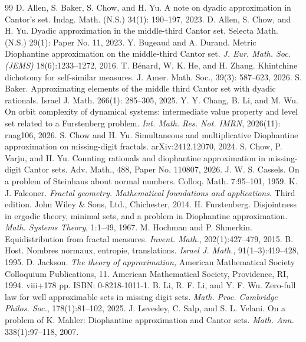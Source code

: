 \documentclass[10pt,a4paper]{amsart}
\numberwithin{equation}{section} %
\begin{document}
\begin{thebibliography}{99}
 D. Allen, S. Baker, S. Chow, and H. Yu. A note on dyadic approximation in Cantor's set. Indag. Math. (N.S.) 34(1): 190–197, 2023.
 D. Allen, S. Chow, and H. Yu. Dyadic approximation in the middle-third Cantor set. Selecta Math. (N.S.) 29(1): Paper No. 11, 2023.
 Y. Bugeaud and A. Durand. Metric Diophantine approximation on the middle-third Cantor set. {\em J. Eur. Math. Soc. (JEMS)} 18(6):1233--1272, 2016.
 T. Bénard, W. K. He, and H. Zhang. Khintchine dichotomy for self-similar measures. J. Amer. Math. Soc., 39(3): 587--623, 2026.
 S. Baker. Approximating elements of the middle third Cantor set with dyadic rationals. Israel J. Math. 266(1): 285--305, 2025.
 Y. Y. Chang, B. Li, and M. Wu. On orbit complexity of dynamical systems: intermediate value property and level set related to a Furstenberg problem. {\em Int. Math. Res. Not. IMRN}, 2026(11): rnag106, 2026.
 S. Chow and H. Yu. Simultaneous and multiplicative Diophantine approximation on missing-digit fractals. arXiv:2412.12070, 2024.
 S. Chow, P. Varju, and H. Yu. Counting rationals and diophantine approximation in missing-digit Cantor sets. Adv. Math., 488, Paper No. 110807, 2026.
 J. W. S. Cassels. On a problem of Steinhaus about normal numbers. Colloq. Math. 7:95–101, 1959.
 K. J. Falconer. {\it Fractal geometry. Mathematical foundations and applications}. Third edition. John Wiley \& Sons, Ltd., Chichester, 2014.
 H. Furstenberg. Disjointness in ergodic theory, minimal sets, and a problem in Diophantine approximation. {\em Math. Systems Theory}, 1:1--49, 1967.
 M. Hochman and P. Shmerkin. Equidistribution from fractal measures. {\em Invent. Math.}, 202(1):427--479, 2015.
 B. Host. Nombres normaux, entropie, translations. {\em Israel J. Math.}, 91(1--3):419--428, 1995.
 D. Jackson. \textit{The theory of approximation,} American Mathematical Society Colloquium Publications, 11. American Mathematical Society, Providence, RI, 1994. viii+178 pp. ISBN: 0-8218-1011-1.
 B. Li, R. F. Li, and Y. F. Wu. Zero-full law for well approximable sets in missing digit sets. {\em Math. Proc. Cambridge Philos. Soc.}, 178(1):81--102, 2025.
 J. Levesley, C. Salp, and S. L. Velani. On a problem of K. Mahler: Diophantine approximation and Cantor sets. {\em Math. Ann.} 338(1):97--118, 2007.

\end{thebibliography}
\end{document}
